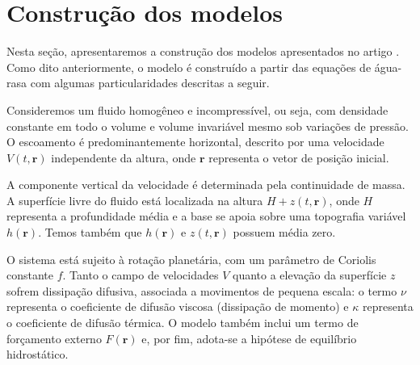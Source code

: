 \section{Construção dos modelos} \label{sec:ch01_construcao_do_modelo}
Nesta seção, apresentaremos a construção dos modelos apresentados no artigo \citet{Lorenz1980}. Como dito anteriormente, o modelo é construído a partir das equações de água-rasa com algumas particularidades descritas a seguir. 

Consideremos um fluido homogêneo e incompressível, ou seja, com densidade constante em todo o volume e volume invariável mesmo sob variações de pressão. O escoamento é predominantemente horizontal, descrito por uma velocidade $V(t, \mathbf{r})$ independente da altura, onde $\mathbf{r}$ representa o vetor de posição inicial.

A componente vertical da velocidade é determinada pela continuidade de massa. A superfície livre do fluido está localizada na altura $H + z(t, \mathbf{r})$, onde $H$ representa a profundidade média e a base se apoia sobre uma topografia variável $h(\mathbf{r})$. Temos também que $h(\mathbf{r})$ e $z(t, \mathbf{r})$ possuem média zero.

O sistema está sujeito à rotação planetária, com um parâmetro de Coriolis constante $f$. 
Tanto o campo de velocidades $V$ quanto a elevação da superfície $z$ sofrem dissipação difusiva, 
associada a movimentos de pequena escala: o termo $\nu$ representa o coeficiente de difusão viscosa (dissipação de momento) e $\kappa$ representa o coeficiente de difusão térmica. O modelo também inclui um termo de forçamento externo $F(\mathbf{r})$ e, por fim, adota-se a hipótese de equilíbrio hidrostático.


